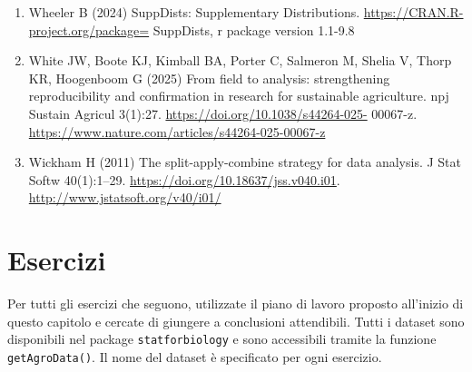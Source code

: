 \documentclass[
  12pt,
]{book}
\begin{document}
\begin{enumerate}
\item
  Wheeler B (2024) SuppDists: Supplementary Distributions. \url{https://CRAN.R-project.org/package=} SuppDists, r package version 1.1-9.8
\item
  White JW, Boote KJ, Kimball BA, Porter C, Salmeron M, Shelia V, Thorp KR, Hoogenboom G (2025) From field to analysis: strengthening reproducibility and confirmation in research for sustainable agriculture. npj Sustain Agricul 3(1):27. \url{https://doi.org/10.1038/s44264-025-} 00067-z. \url{https://www.nature.com/articles/s44264-025-00067-z}
\item
  Wickham H (2011) The split-apply-combine strategy for data analysis. J Stat Softw 40(1):1--29. \url{https://doi.org/10.18637/jss.v040.i01}. \url{http://www.jstatsoft.org/v40/i01/}
\end{enumerate}

\hypertarget{esercizi-3}{%
\section{Esercizi}\label{esercizi-3}}

Per tutti gli esercizi che seguono, utilizzate il piano di lavoro proposto all'inizio di questo capitolo e cercate di giungere a conclusioni attendibili. Tutti i dataset sono disponibili nel package \texttt{statforbiology} e sono accessibili tramite la funzione \texttt{getAgroData()}. Il nome del dataset è specificato per ogni esercizio.
\end{document}
